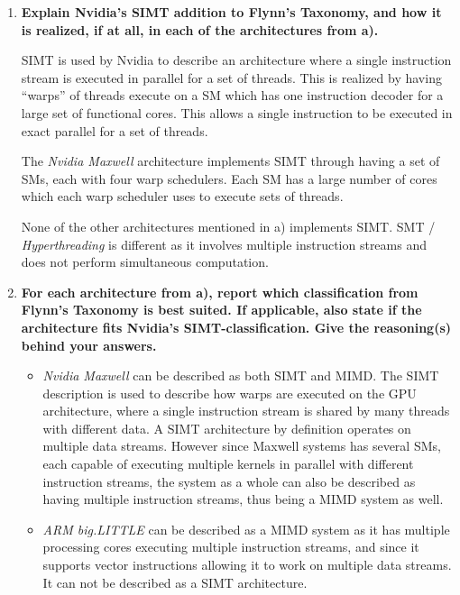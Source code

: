 \begin{enumerate}
\begin{enumerate}
\end{enumerate}

\item \textbf{Explain Nvidia's SIMT addition to Flynn's Taxonomy, and how it is realized, if at all, in each of the architectures from a).}

\acf{SIMT} is used by Nvidia to describe an architecture where a single instruction stream is executed in parallel for a set of threads. This is realized by having ``warps'' of threads execute on a \acf{SM} which has one instruction decoder for a large set of functional cores. This allows a single instruction to be executed in exact parallel for a set of threads.

The \textit{Nvidia Maxwell} architecture implements \ac{SIMT} through having a set of \acp{SM}, each with four warp schedulers. Each \ac{SM} has a large number of cores which each warp scheduler uses to execute sets of threads.

None of the other architectures mentioned in a) implements \ac{SIMT}. \ac{SMT} / \textit{Hyperthreading} is different as it involves multiple instruction streams and does not perform simultaneous computation.

\item \textbf{For each architecture from a), report which classification from Flynn's Taxonomy is best suited. If applicable, also state if the architecture fits Nvidia's SIMT-classification. Give the reasoning(s) behind your answers.}

\begin{itemize}

\item
\textit{Nvidia Maxwell} can be described as both \ac{SIMT} and \ac{MIMD}. The \ac{SIMT} description is used to describe how warps are executed on the \ac{GPU} architecture, where a single instruction stream is shared by many threads with different data. A \ac{SIMT} architecture by definition operates on multiple data streams. However since Maxwell systems has several \acp{SM}, each capable of executing multiple kernels in parallel with different instruction streams, the system as a whole can also be described as having multiple instruction streams, thus being a \ac{MIMD} system as well.

\item
\textit{ARM big.LITTLE} can be described as a \ac{MIMD} system as it has multiple processing cores executing multiple instruction streams, and since it supports vector instructions allowing it to work on multiple data streams. It can not be described as a \ac{SIMT} architecture.


\end{itemize}
\end{enumerate}
